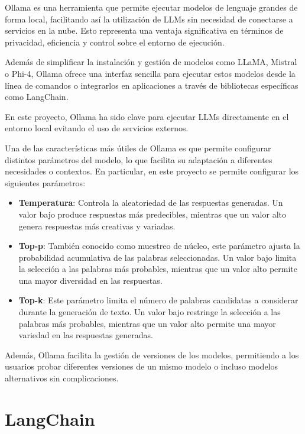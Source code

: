 Ollama es una herramienta que permite ejecutar modelos de lenguaje grandes de forma local, 
facilitando así la utilización de LLMs sin necesidad de conectarse a servicios en la nube. 
Esto representa una ventaja significativa en términos de privacidad, eficiencia y control 
sobre el entorno de ejecución.

Además de simplificar la instalación y gestión de modelos como LLaMA, Mistral o Phi-4, 
Ollama ofrece una interfaz sencilla para ejecutar estos modelos desde la línea de comandos 
o integrarlos en aplicaciones a través de bibliotecas específicas como LangChain. 

En este proyecto, Ollama ha sido clave para ejecutar LLMs directamente en el entorno local
evitando el uso de servicios externos.

Una de las características más útiles de Ollama es que permite configurar distintos parámetros 
del modelo, lo que facilita su adaptación a diferentes necesidades o contextos. 
En particular, en este proyecto se permite configurar los siguientes parámetros:

\begin{itemize}
	\item \textbf{Temperatura}: Controla la aleatoriedad de las respuestas generadas. Un valor bajo 
		produce respuestas más predecibles, mientras que un valor alto genera respuestas 
		más creativas y variadas.
	\item \textbf{Top-p}: También conocido como muestreo de núcleo, este parámetro ajusta la
		probabilidad acumulativa de las palabras seleccionadas. Un valor bajo limita la 
		selección a las palabras más probables, mientras que un valor alto permite una 
		mayor diversidad en las respuestas.
	\item \textbf{Top-k}: Este parámetro limita el número de palabras candidatas a considerar
		durante la generación de texto. Un valor bajo restringe la selección a las palabras 
		más probables, mientras que un valor alto permite una mayor variedad en las 
		respuestas generadas.
\end{itemize}

Además, Ollama facilita la gestión de versiones de los modelos, permitiendo a los usuarios
probar diferentes versiones de un mismo modelo o incluso modelos alternativos sin complicaciones.

\section{LangChain}

